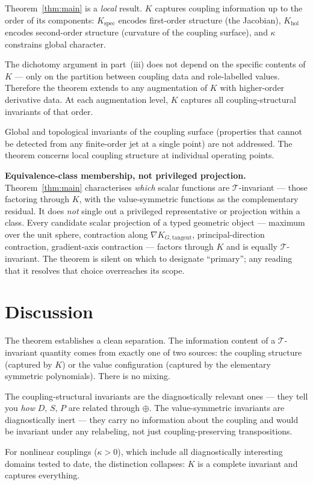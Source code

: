 \documentclass[12pt,a4paper]{article}
\theoremstyle{definition}
\theoremstyle{plain}
\theoremstyle{remark}
\newcommand{\T}{\mathcal{T}}
\begin{document}
Theorem~\ref{thm:main} is a \emph{local} result. $K$ captures coupling information up to the order of its components: $K_{\mathrm{spec}}$ encodes first-order structure (the Jacobian), $K_{\mathrm{hol}}$ encodes second-order structure (curvature of the coupling surface), and $\kappa$ constrains global character.

The dichotomy argument in part~(iii) does not depend on the specific contents of $K$ --- only on the partition between coupling data and role-labelled values. Therefore the theorem extends to any augmentation of $K$ with higher-order derivative data. At each augmentation level, $K$ captures all coupling-structural invariants of that order.

Global and topological invariants of the coupling surface (properties that cannot be detected from any finite-order jet at a single point) are not addressed. The theorem concerns local coupling structure at individual operating points.

\medskip
\noindent\textbf{Equivalence-class membership, not privileged projection.} Theorem~\ref{thm:main} characterises \emph{which} scalar functions are $\T$-invariant --- those factoring through $K$, with the value-symmetric functions as the complementary residual. It does \emph{not} single out a privileged representative or projection within a class. Every candidate scalar projection of a typed geometric object --- maximum over the unit sphere, contraction along $\nabla K_{G,\mathrm{tangent}}$, principal-direction contraction, gradient-axis contraction --- factors through $K$ and is equally $\T$-invariant. The theorem is silent on which to designate ``primary''; any reading that it resolves that choice overreaches its scope.


\section{Discussion}

The theorem establishes a clean separation. The information content of a $\T$-invariant quantity comes from exactly one of two sources: the coupling structure (captured by $K$) or the value configuration (captured by the elementary symmetric polynomials). There is no mixing.

The coupling-structural invariants are the diagnostically relevant ones --- they tell you \emph{how} $D$, $S$, $P$ are related through $\oplus$. The value-symmetric invariants are diagnostically inert --- they carry no information about the coupling and would be invariant under any relabeling, not just coupling-preserving transpositions.

For nonlinear couplings ($\kappa > 0$), which include all diagnostically interesting domains tested to date, the distinction collapses: $K$ is a complete invariant and captures everything.
\end{document}
